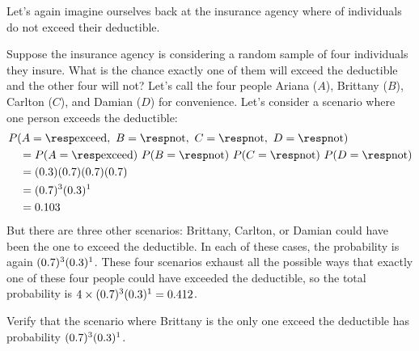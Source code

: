 \noindent%
Let's again imagine ourselves back at the insurance agency
where \insureSperc{} of individuals do not exceed their
deductible.

\begin{examplewrap}
\begin{nexample}{Suppose the insurance agency is considering
    a random sample of four individuals they insure.
    What is the chance exactly one of them will exceed
    the deductible and the other four will not?
    Let's call the four people
    Ariana ($A$),
    Brittany ($B$),
    Carlton ($C$),
    and Damian ($D$)
    for convenience.}
  \label{insureOneOfFourExceedsDeductible}%
  Let's consider a scenario where one person exceeds
  the deductible:
  \begin{align*}
  &P(A=\text{\insureF{}},
      \text{ }B=\text{\insureS{}},
      \text{ }C=\text{\insureS{}},
      \text{ }D=\text{\insureS{}}) \\
    &\quad = P(A=\text{\insureF{}})\ 
        P(B=\text{\insureS{}})\ 
        P(C=\text{\insureS{}})\ 
        P(D=\text{\insureS{}}) \\
    &\quad =  (\insureFprob{})
        (\insureSprob{})
        (\insureSprob{})
        (\insureSprob{}) \\
    &\quad = (\insureSprob{})^3 (\insureFprob{})^1 \\
    &\quad = \insureBinomCinDSingleScenario{}
  \end{align*}
  But there are three other scenarios: Brittany, Carlton,
  or Damian could have been the one to exceed the deductible.
  In each of these cases, the probability is again
  $(0.7{})^3 (0.3{})^1$.
  These four scenarios exhaust all the possible ways that
  exactly one of these four people could have exceeded
  the deductible, so the total probability is
  $4 \times (0.7{})^3 (0.3{})^1
      = 0.412{}$.
\end{nexample}
\end{examplewrap}

\begin{exercisewrap}
\begin{nexercise}
Verify that the scenario where Brittany is the only one
exceed the deductible has probability
$(0.7{})^3 (0.3{})^1$.~\footnotemark{}
\end{nexercise}
\end{exercisewrap}



